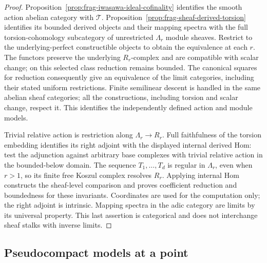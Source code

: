 \documentclass[11pt]{article}
\theoremstyle{definition}
\theoremstyle{remark}
\begin{document}
\begin{proof}
Proposition~\ref{prop:frag-iwasawa-ideal-cofinality} identifies the smooth
action abelian category with $\mathcal T$.  Proposition~\ref{prop:frag-sheaf-derived-torsion}
identifies its bounded derived objects and their mapping spectra with
the full torsion-cohomology subcategory of unrestricted $\Lambda_r$
module sheaves.  Restrict to the underlying-perfect constructible
objects to obtain the equivalence at each $r$.  The functors preserve
the underlying $R_r$-complex and are compatible with scalar change;
on this selected class reduction remains bounded.  The canonical
squares for reduction consequently give an equivalence of the limit
categories, including their stated uniform restrictions.  Finite
semilinear descent is handled in the same abelian sheaf categories;
all the constructions, including torsion and scalar change, respect it.
This identifies the independently defined action and module models.

Trivial relative action is restriction along $\Lambda_r\to R_r$.
Full faithfulness of the torsion embedding identifies its right
adjoint with the displayed internal derived Hom: test the adjunction
against arbitrary base complexes with trivial relative action in the
bounded-below domain.  The sequence $T_1,\ldots,T_d$ is regular in
$\Lambda_r$, even when $r>1$, so its finite free Koszul complex resolves
$R_r$.  Applying internal Hom constructs the sheaf-level comparison
and proves coefficient reduction and boundedness for these invariants.
Coordinates are used for the computation only; the right adjoint is
intrinsic.  Mapping spectra in the adic category are limits by its
universal property.  This last assertion is categorical and does not
interchange sheaf stalks with inverse limits.
\end{proof}

\subsection{Pseudocompact models at a point}
\end{document}
